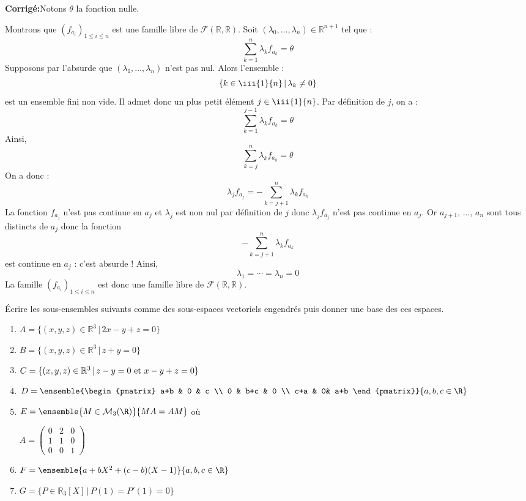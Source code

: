 \documentclass[a4paper,twoside,french,10pt]{VcCours}
\newcommand{\corr}{\textbf{Corrigé:}}
\begin{document}
\corr Notons $\theta$ la fonction nulle. 

Montrons que $(f_{a_i})_{1 \leq i \leq n}$ est une famille libre de $\mathcal{F}(\mathbb{R}, \mathbb{R})$. Soit $(\lambda_0, \ldots, \lambda_n) \in \mathbb{R}^{n+1}$ tel que :
$$ \sum_{k=1}^n \lambda_k f_{a_k} = \theta$$
Supposons par l'absurde que $(\lambda_1, \ldots, \lambda_n)$ n'est pas nul. Alors l'ensemble :
$$ \lbrace k \in \iii{1}{n} \, \vert \, \lambda_k \neq 0 \rbrace$$
est un ensemble fini non vide. Il admet donc un plus petit élément $j \in \iii{1}{n}$. Par définition de $j$, on a :
$$ \sum_{k=1}^{j-1} \lambda_k f_{a_k} = \theta$$
Ainsi,
$$ \sum_{k=j}^n \lambda_k f_{a_k} = \theta$$
On a donc :
$$ \lambda_j f_{a_j} = - \sum_{k=j+1}^n \lambda_k f_{a_k}$$
La fonction $f_{a_j}$ n'est pas continue en $a_j$ et $\lambda_j$ est non nul par définition de $j$ donc $\lambda_j f_{a_j}$ n'est pas continue en $a_j$. Or $a_{j+1}$, $\ldots$, $a_n$ sont tous distincts de $a_j$ donc la fonction 
$$ - \sum_{k=j+1}^n \lambda_k f_{a_k}$$
est continue en $a_j$ : c'est absurde ! Ainsi, 
$$ \lambda_1 = \cdots = \lambda_n = 0$$
La famille $(f_{a_i})_{1 \leq i \leq n}$ est donc une famille libre de $\mathcal{F}(\mathbb{R}, \mathbb{R})$.

\medskip

\begin{Exercice}{} Écrire les sous-ensembles suivants comme des sous-espaces vectoriels engendrés puis donner une base des ces espaces. 

\begin{multicols}{2}
\begin{enumerate}
\item $A=\lbrace (x,y,z) \in \mathbb{R}^3 \, \vert  \, 2x-y+z=0 \rbrace$
\item $B= \lbrace (x,y,z) \in \mathbb{R}^3 \, \vert \, z+y=0 \rbrace$
\item $C= \lbrace (x,y,z) \in \mathbb{R}^3 \, \vert \, z-y=0 \hbox{ et } x-y+z=0 \rbrace\!\!\!\!\!$

\item $D = \ensemble{\begin{pmatrix}
a+b & 0 & c \\
0 & b+c & 0 \\
c+a & 0& a+b 
\end{pmatrix}}{a,b,c\in\R}$

\columnbreak
\item $E = \ensemble{M \in \mathcal{M}_3(\R)}{MA=AM}$ où
\begin{center}
$A = \begin{pmatrix}
0 & 2 & 0 \\
1 & 1 & 0 \\
0 & 0 & 1 
\end{pmatrix}$
\end{center}
\item $F= \ensemble{a + bX^2 + (c-b)(X-1)}{a,b,c\in\R}$
\item $G = \lbrace P \in \mathbb{R}_3[X] \, \vert \,  P(1)=P'(1)=0 \rbrace$
\end{enumerate}
\end{multicols}
\end{Exercice}
\end{document}
